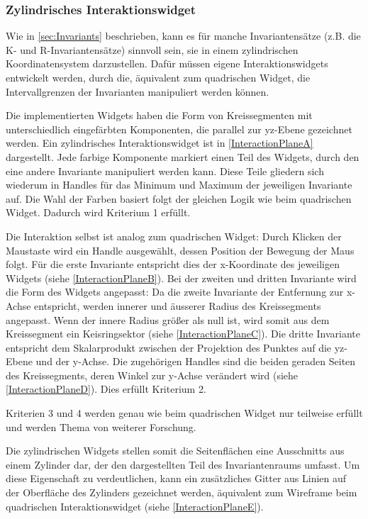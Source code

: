 \documentclass[a4paper,fontsize=12pt,toc=bib,halfparskip,ngerman]{scrartcl}
\begin{document}
\subsubsection{Zylindrisches Interaktionswidget}
Wie in \cref{sec:Invariants} beschrieben, kann es f\"ur manche Invariantens\"atze (z.B. die K- und R-Invariantens\"atze) sinnvoll sein, sie in einem zylindrischen Koordinatensystem darzustellen. Daf\"ur m\"ussen eigene Interaktionswidgets entwickelt werden, durch die, \"aquivalent zum quadrischen Widget, die Intervallgrenzen der Invarianten manipuliert werden k\"onnen.

Die implementierten Widgets haben die Form von Kreissegmenten mit unterschiedlich eingef\"arbten Komponenten, die parallel zur yz-Ebene gezeichnet werden. Ein zylindrisches Interaktionswidget ist in \cref{InteractionPlaneA} dargestellt. Jede farbige Komponente markiert einen Teil des Widgets, durch den eine andere Invariante manipuliert werden kann. Diese Teile gliedern sich wiederum in Handles f\"ur das Minimum und Maximum der jeweiligen Invariante auf. Die Wahl der Farben basiert folgt der gleichen Logik wie beim quadrischen Widget. Dadurch wird Kriterium 1 erf\"ullt.

Die Interaktion selbst ist analog zum quadrischen Widget: Durch Klicken der Maustaste wird ein Handle ausgew\"ahlt, dessen Position der Bewegung der Maus folgt. F\"ur die erste Invariante entspricht dies der x-Koordinate des jeweiligen Widgets (siehe \cref{InteractionPlaneB}). Bei der zweiten und dritten Invariante wird die Form des Widgets angepasst: Da die zweite Invariante der Entfernung zur x-Achse entspricht, werden innerer und \"ausserer Radius des Kreissegments angepasst. Wenn der innere Radius gr\"o{\ss}er als null ist, wird somit aus dem Kreissegment ein Keisringsektor (siehe \cref{InteractionPlaneC}). Die dritte Invariante entspricht dem Skalarprodukt zwischen der Projektion des Punktes auf die yz-Ebene und der y-Achse. Die zugeh\"origen Handles sind die beiden geraden Seiten des Kreissegments, deren Winkel zur y-Achse ver\"andert wird (siehe \cref{InteractionPlaneD}). Dies erf\"ullt Kriterium 2.

Kriterien 3 und 4 werden genau wie beim quadrischen Widget nur teilweise erf\"ullt und werden Thema von weiterer Forschung.

Die zylindrischen Widgets stellen somit die Seitenfl\"achen eine Ausschnitts aus einem Zylinder dar, der den dargestellten Teil des Invariantenraums umfasst. Um diese Eigenschaft zu verdeutlichen, kann ein zus\"atzliches Gitter aus Linien auf der Oberfl\"ache des Zylinders gezeichnet werden, \"aquivalent zum Wireframe beim quadrischen Interaktionswidget (siehe \cref{InteractionPlaneE}).
\end{document}
